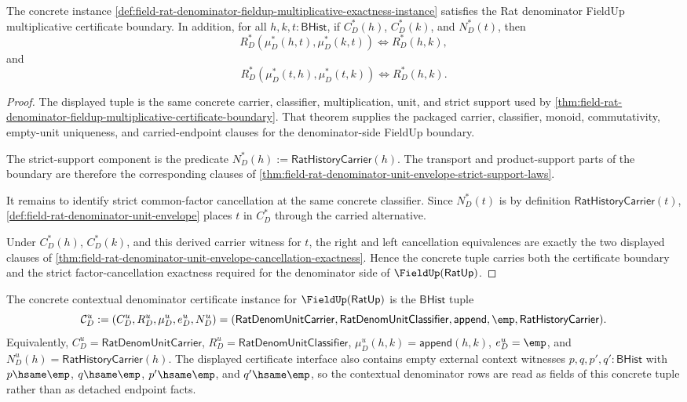 \begin{theorem}
\label{thm:field-rat-denominator-fieldup-multiplicative-exactness-boundary}
The concrete instance
\autoref{def:field-rat-denominator-fieldup-multiplicative-exactness-instance}
satisfies the Rat denominator FieldUp multiplicative certificate boundary. In
addition, for all $h,k,t:\mathsf{BHist}$, if $C_D^\ast(h)$, $C_D^\ast(k)$,
and $N_D^\ast(t)$, then
$$
R_D^\ast(\mu_D^\ast(h,t),\mu_D^\ast(k,t))
\Longleftrightarrow R_D^\ast(h,k),
$$
and
$$
R_D^\ast(\mu_D^\ast(t,h),\mu_D^\ast(t,k))
\Longleftrightarrow R_D^\ast(h,k).
$$
\end{theorem}
\begin{proof}
The displayed tuple is the same concrete carrier, classifier, multiplication,
unit, and strict support used by
\autoref{thm:field-rat-denominator-fieldup-multiplicative-certificate-boundary}.
That theorem supplies the packaged carrier, classifier, monoid, commutativity,
empty-unit uniqueness, and carried-endpoint clauses for the denominator-side
FieldUp boundary.

The strict-support component is the predicate
$N_D^\ast(h):=\mathsf{RatHistoryCarrier}(h)$. The transport and product-support
parts of the boundary are therefore the corresponding clauses of
\autoref{thm:field-rat-denominator-unit-envelope-strict-support-laws}.

It remains to identify strict common-factor cancellation at the same concrete
classifier. Since $N_D^\ast(t)$ is by definition
$\mathsf{RatHistoryCarrier}(t)$, \autoref{def:field-rat-denominator-unit-envelope}
places $t$ in $C_D^\ast$ through the carried alternative.

Under $C_D^\ast(h)$, $C_D^\ast(k)$, and this derived carrier witness for $t$,
the right and left cancellation equivalences are exactly the two displayed
clauses of
\autoref{thm:field-rat-denominator-unit-envelope-cancellation-exactness}. Hence
the concrete tuple carries both the certificate boundary and the strict
factor-cancellation exactness required for the denominator side of
$\FieldUp(\mathsf{RatUp})$.
\end{proof}

\begin{definition}
\label{def:field-rat-denominator-fieldup-contextual-certificate-instance}
The concrete contextual denominator certificate instance for
$\FieldUp(\mathsf{RatUp})$ is the $\mathsf{BHist}$ tuple
$$
\mathcal{C}_D^u:=(C_D^u,R_D^u,\mu_D^u,e_D^u,N_D^u)
=
(\mathsf{RatDenomUnitCarrier},\mathsf{RatDenomUnitClassifier},
\mathsf{append},\emp,\mathsf{RatHistoryCarrier}).
$$
Equivalently, $C_D^u=\mathsf{RatDenomUnitCarrier}$,
$R_D^u=\mathsf{RatDenomUnitClassifier}$,
$\mu_D^u(h,k)=\mathsf{append}(h,k)$, $e_D^u=\emp$, and
$N_D^u(h)=\mathsf{RatHistoryCarrier}(h)$. The displayed certificate interface
also contains empty external context witnesses $p,q,p',q':\mathsf{BHist}$ with
$p\hsame\emp$, $q\hsame\emp$, $p'\hsame\emp$, and $q'\hsame\emp$, so the
contextual denominator rows are read as fields of this concrete tuple rather
than as detached endpoint facts.
\end{definition}

